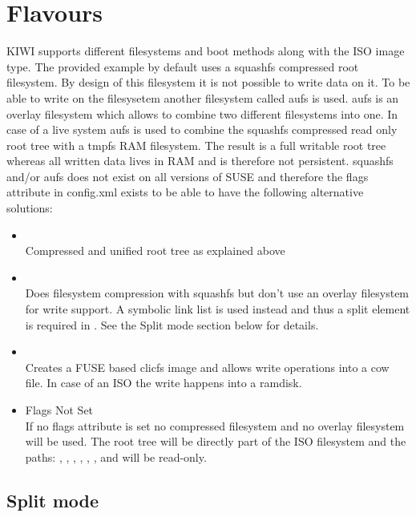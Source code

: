 \section{Flavours}

KIWI supports different filesystems and boot methods along with the
ISO image type. The provided example by default uses a squashfs compressed
root filesystem. By design of this filesystem it is not possible to write
data on it. To be able to write on the filesysetem another filesystem called
aufs is used. aufs is an overlay filesystem which allows to combine two
different filesystems into one. In case of a live system aufs is used
to combine the squashfs compressed read only root tree with a tmpfs
RAM filesystem. The result is a full writable root tree whereas all
written data lives in RAM and is therefore not persistent. squashfs and/or
aufs does not exist on all versions of SUSE and therefore the flags
attribute in config.xml exists to be able to have the following
alternative solutions:

\begin{itemize}
\item {}\\
      Compressed and unified root tree as explained above
\item {}\\
      Does filesystem compression with squashfs but don't use an
      overlay filesystem for write support. A symbolic link list is used
      instead and thus a split element is required in .
      See the Split mode section below for details.
\item {}\\
      Creates a FUSE based clicfs image and allows write operations
      into a cow file. In case of an ISO the write happens into a
      ramdisk.
\item {Flags Not Set}\\
      If no flags attribute is set no compressed filesystem and no overlay
      filesystem will be used. The root tree will be directly part of
      the ISO filesystem and the paths: , , 
      , , ,
      , and  will be read-only.
\end{itemize}

\subsection{Split mode}

